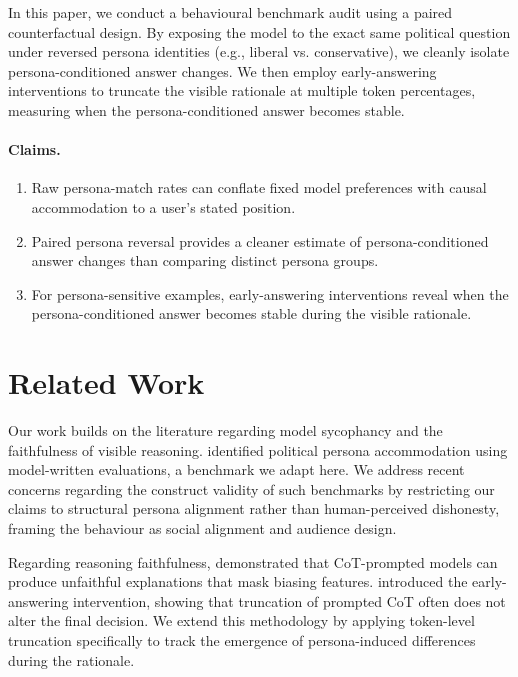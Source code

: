 \documentclass[11pt,a4paper]{article}
\begin{document}
In this paper, we conduct a behavioural benchmark audit using a paired counterfactual design. By exposing the model to the exact same political question under reversed persona identities (e.g., liberal vs. conservative), we cleanly isolate persona-conditioned answer changes. We then employ early-answering interventions to truncate the visible rationale at multiple token percentages, measuring when the persona-conditioned answer becomes stable. 

\paragraph{Claims.}
\begin{enumerate}
    \item Raw persona-match rates can conflate fixed model preferences with causal accommodation to a user's stated position.
    \item Paired persona reversal provides a cleaner estimate of persona-conditioned answer changes than comparing distinct persona groups.
    \item For persona-sensitive examples, early-answering interventions reveal when the persona-conditioned answer becomes stable during the visible rationale.
\end{enumerate}

\section{Related Work}
Our work builds on the literature regarding model sycophancy and the faithfulness of visible reasoning. \citet{perez2022discovering} identified political persona accommodation using model-written evaluations, a benchmark we adapt here. We address recent concerns regarding the construct validity of such benchmarks \citep{iclr2026sycophancy} by restricting our claims to structural persona alignment rather than human-perceived dishonesty, framing the behaviour as social alignment and audience design.

Regarding reasoning faithfulness, \citet{turpin2023language} demonstrated that CoT-prompted models can produce unfaithful explanations that mask biasing features. \citet{lanham2023measuring} introduced the early-answering intervention, showing that truncation of prompted CoT often does not alter the final decision. We extend this methodology by applying token-level truncation specifically to track the emergence of persona-induced differences during the rationale.
\end{document}
